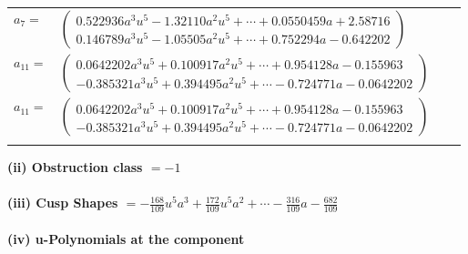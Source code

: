 \documentclass[1p]{elsarticle_modified}
\theoremstyle{definition}
\begin{document}
\begin{tabular}{m{7pt} m{180pt} m{7pt} m{180pt} }
\flushright $a_{7}=$&$\begin{pmatrix}0.522936 a^{3} u^{5}-1.32110 a^{2} u^{5}+\cdots+0.0550459 a+2.58716\\0.146789 a^{3} u^{5}-1.05505 a^{2} u^{5}+\cdots+0.752294 a-0.642202\end{pmatrix}$ \\
\flushright $a_{11}=$&$\begin{pmatrix}0.0642202 a^{3} u^{5}+0.100917 a^{2} u^{5}+\cdots+0.954128 a-0.155963\\-0.385321 a^{3} u^{5}+0.394495 a^{2} u^{5}+\cdots-0.724771 a-0.0642202\end{pmatrix}$\\ \flushright $a_{11}=$&$\begin{pmatrix}0.0642202 a^{3} u^{5}+0.100917 a^{2} u^{5}+\cdots+0.954128 a-0.155963\\-0.385321 a^{3} u^{5}+0.394495 a^{2} u^{5}+\cdots-0.724771 a-0.0642202\end{pmatrix}$\\&\end{tabular}
\flushleft \textbf{(ii) Obstruction class $= -1$}\\~\\
\flushleft \textbf{(iii) Cusp Shapes $= -\frac{168}{109} u^5 a^3+\frac{172}{109} u^5 a^2+\cdots-\frac{316}{109} a-\frac{682}{109}$}\\~\\
\newpage\renewcommand{\arraystretch}{1}
\flushleft \textbf{(iv) u-Polynomials at the component}\newline \\
\end{document}
